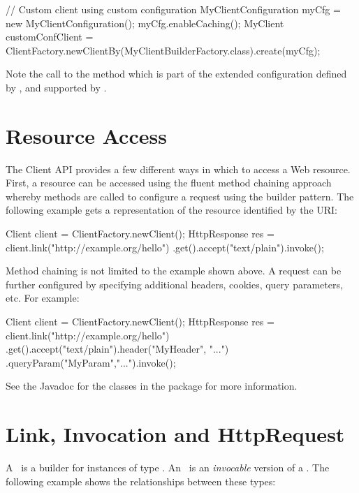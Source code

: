 \begin{listing}{1}
// Custom client using custom configuration
MyClientConfiguration myCfg = new MyClientConfiguration();
myCfg.enableCaching();
MyClient customConfClient = 
    ClientFactory.newClientBy(MyClientBuilderFactory.class).create(myCfg);
\end{listing}

Note the call to the method  which is part of the extended configuration defined by , and supported by .

\section{Resource Access}
\label{resource_access}

The Client API provides a few different ways in which to access a Web resource. First, a resource can be accessed using the fluent method chaining approach whereby methods are called to configure a request using the builder pattern. The following example gets a  representation of the resource identified by the  URI:

\begin{listing}{1}
Client client = ClientFactory.newClient();
HttpResponse res = client.link("http://example.org/hello")
    .get().accept("text/plain").invoke();
\end{listing}

Method chaining is not limited to the example shown above. A request can be further configured by specifying additional headers, cookies, query parameters, etc. For example:

\begin{listing}{1}
Client client = ClientFactory.newClient();
HttpResponse res = client.link("http://example.org/hello")
    .get().accept("text/plain").header("MyHeader", "...")
    .queryParam("MyParam","...").invoke();
\end{listing}

See the Javadoc for the classes in the  package for more information.

\section{Link, Invocation and HttpRequest}

A \Link\ is a builder for instances of type \Invocation. An \Invocation\ is an \emph{invocable} version of a \HttpRequest. The following example shows the relationships between these types:

